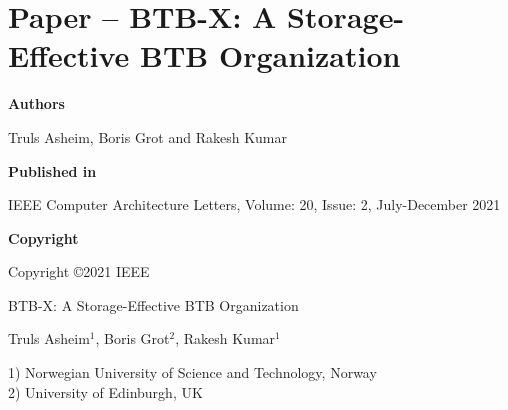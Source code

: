 \documentclass[../../../main.tex]{subfiles}
\begin{document}
\chapter{Paper  -- BTB-X: A Storage-Effective BTB Organization}
\label{chap:cal-paper}

\noindent \textbf{Authors}

\vspace*{0.3cm}

\noindent Truls Asheim, Boris Grot and Rakesh Kumar

\vspace*{0.7cm}

\noindent \textbf{Published in}

\vspace*{0.3cm}

\noindent IEEE Computer Architecture Letters, Volume: 20, Issue: 2, July-December 2021

\vspace*{0.7cm}

\noindent \textbf{Copyright}

\vspace*{0.3cm}

\noindent Copyright ©2021 IEEE

\newpage

\vspace*{0.1cm}

\begin{center}

\Huge{BTB-X: A Storage-Effective BTB Organization}

\vspace{0.6cm}

\large{Truls Asheim$^{1}$, Boris Grot$^{2}$, Rakesh Kumar$^{1}$}

\vspace{0.1cm}

\small{1) Norwegian University of Science and Technology, Norway}\\
\small{2) University of Edinburgh, UK}


\end{center}

\vspace{0.2cm}
\end{document}
